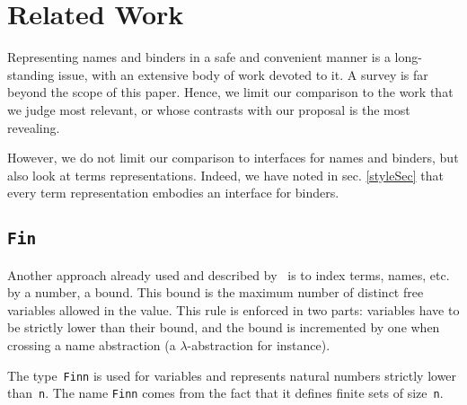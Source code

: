 \documentclass[9pt,authoryear]{sigplanconf}
\begin{document}
\section{Related Work\label{comparison}}

%
Representing names and binders in a safe and convenient manner is a
    long-standing issue, with an extensive body of work devoted to it.
    A survey is far beyond the scope of this paper. Hence, we limit our
    comparison to the work that we judge most relevant, or whose contrasts
    with our proposal is the most revealing.%


%
However, we do not limit our comparison to interfaces for names and
    binders, but also look at terms representations. Indeed, we have
    noted in sec. \ref{styleSec} that every term representation embodies
    an interface for binders.%


\subsection{\texttt{Fin}}

%
Another approach already used and described by{~}\citet{altenkirch-93,mcbride-mckinna-04} is
    to index terms, names, etc. by a number, a bound. This bound is the
    maximum number of distinct free variables allowed in the value. This
    rule is enforced in two parts{:} variables have to be strictly lower
    than their bound, and the bound is incremented by one when crossing
    a name abstraction (a $ \lambda $-abstraction for instance).%


%
The type{~}\texttt{Fin}\texttt{\mbox{\hspace{0.50em}}}\texttt{n} is used for variables and represents natural
    numbers strictly lower than{~}\texttt{n}. The name \texttt{Fin}\texttt{\mbox{\hspace{0.50em}}}\texttt{n} comes from the
    fact that it defines finite sets of size{~}\texttt{n}.%
\end{document}
